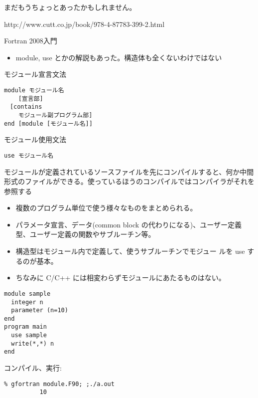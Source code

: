\documentclass[12pt,dvipdfmx]{article}
\begin{document}
まだもうちょっとあったかもしれません。


http://www.cutt.co.jp/book/978-4-87783-399-2.html

Fortran 2008入門

\begin{itemize}

\item module, use とかの解説もあった。構造体も全くないわけではない

\end{itemize}

モジュール宣言文法

\begin{verbatim}
module モジュール名
    [宣言部]
　[contains
    モジュール副プログラム部]
end [module [モジュール名]]
\end{verbatim}

モジュール使用文法

\begin{verbatim}
use モジュール名
\end{verbatim}

モジュールが定義されているソースファイルを先にコンパイルすると、何か中間形式のファイルができる。使っているほうのコンパイルではコンパイラがそれを参照する


\begin{itemize}

\item 複数のプログラム単位で使う様々なものをまとめられる。

\item パラメータ宣言、データ(common block の代わりになる)、ユーザー定義型、ユーザー定義の関数やサブルーチン等。

\item 構造型はモジュール内で定義して、使うサブルーチンでモジュー
ルを use するのが基本。
\item ちなみに C/C++ には相変わらずモジュールにあたるものはない。

\end{itemize}

\begin{verbatim}
module sample
  integer n
  parameter (n=10)
end
program main
  use sample
  write(*,*) n
end
\end{verbatim}
コンパイル、実行:
\begin{verbatim}
% gfortran module.F90; ;./a.out
          10
\end{verbatim}
\end{document}
